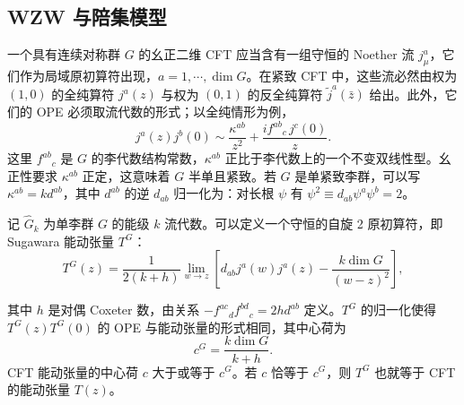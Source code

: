 
\subsection{WZW 与陪集模型}\label{sec:4-3}

一个具有连续对称群 $G$ 的幺正二维 CFT 应当含有一组守恒的 Noether 流 $j^a_\mu$，它们作为局域原初算符出现，$a=1,\cdots,\dim G$。在紧致 CFT 中，这些流必然由权为 $(1,0)$ 的全纯算符 $j^a(z)$ 与权为 $(0,1)$ 的反全纯算符 $\tilde j^a(\bar z)$ 给出。此外，它们的 OPE 必须取流代数的形式；以全纯情形为例，
\begin{equation}
  \label{eq:4-12}
  j^a(z)j^b(0)\sim\frac{\kappa^{ab}}{z^2}+\frac{if^{ab}{}_c\,j^c(0)}{z}.
\end{equation}
这里 $f^{ab}{}_c$ 是 $G$ 的李代数结构常数，$\kappa^{ab}$ 正比于李代数上的一个不变双线性型。幺正性要求 $\kappa^{ab}$ 正定，这意味着 $G$ 半单且紧致。若 $G$ 是单紧致李群，可以写 $\kappa^{ab}=kd^{ab}$，其中 $d^{ab}$ 的逆 $d_{ab}$ 归一化为：对长根 $\psi$ 有 $\psi^2\equiv d_{ab}\psi^a\psi^b=2$。

记 $\hat G_k$ 为单李群 $G$ 的能级 $k$ 流代数。可以定义一个守恒的自旋 2 原初算符，即 Sugawara 能动张量 $T^G$：
\begin{equation}
  \label{eq:4-13}
  T^G(z)=\frac{1}{2(k+h)}\lim_{w\to z}\left[d_{ab}j^a(w)j^a(z)-\frac{k\dim G}{(w-z)^2}\right],
\end{equation}

其中 $h$ 是对偶 Coxeter 数，由关系 $-f^{ac}{}_d f^{bd}{}_c=2h d^{ab}$ 定义。$T^G$ 的归一化使得 $T^G(z)T^G(0)$ 的 OPE 与能动张量的形式相同，其中心荷为
\begin{equation}
  \label{eq:4-14}
  c^G=\frac{k\dim G}{k+h}.
\end{equation}
CFT 能动张量的中心荷 $c$ 大于或等于 $c^G$。若 $c$ 恰等于 $c^G$，则 $T^G$ 也就等于 CFT 的能动张量 $T(z)$。


